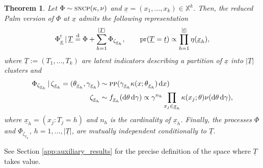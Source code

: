 \documentclass[11pt,a4paper,oneside]{article}
\newcommand{\deq}{\stackrel{\mbox{\scriptsize d}}{=}}
\newcommand{\dd}{\mathrm d}
\newcommand{\X}{\mathbb{X}}
\newcommand{\prob}{{\rm pr}}
\renewcommand{\mid}{\ensuremath{\,|\,}}
\newtheorem{theorem}{Theorem}
\theoremstyle{definition}
\theoremstyle{remark}
\begin{document}
\begin{theorem}\label{thm:red_palm_sncp} 
Let $\Phi \sim \textsc{sncp}(\kappa, \nu)$ and $\underline{x} = (x_1, \ldots, x_k) \in \X^k$. Then, the reduced Palm version of $\Phi$ at $\underline{x}$ admits the following representation
\begin{equation}\label{eq:thesis_palm_sncp}
    \Phi^!_{\underline{x}}\mid \underline{T} \deq \Phi + \sum_{h = 1}^{|\underline{T}|} \Phi_{\zeta_{{\underline{x}}_h}},\qquad \prob(\underline{T} = \underline{t}) \propto \prod_{h=1}^{|\underline{t}|} \eta(\underline{x}_h),
\end{equation}
where $\underline{T} := (T_1,\ldots,T_k)$ are latent indicators describing a partition of $\underline{x}$ into $|\underline{T}|$ clusters and
\begin{equation*}
    \begin{aligned}
        \Phi_{\zeta_{{\underline{x}}_h}} \mid \zeta_{{\underline{x}}_h} = (\theta_{{\underline{x}}_h}, \gamma_{{\underline{x}}_h}) &\sim \textsc{pp}(\gamma_{{\underline{x}}_h} \kappa(x; \theta_{{\underline{x}}_h}) \,\dd x)\\
        \zeta_{{\underline{x}}_h}  &\sim f_{{\underline{x}}_h}(\dd \theta\, \dd \gamma) \propto \gamma^{n_h} \prod_{x_j \in 
        \underline{x}_h}\kappa(x_j;\theta) \nu(\dd \theta\, \dd \gamma),
    \end{aligned}
\end{equation*}
where $\underline{x}_h = (x_j: T_j = h)$ and $n_h$ is the cardinality of $\underline{x}_h$.
Finally, the processes $\Phi$ and $\Phi_{\zeta_{{\underline{x}}_h}}$, $h = 1,\ldots, |\underline{T}|$, are mutually independent conditionally to $\underline{T}$.
\end{theorem}
See Section \ref{app:auxiliary_results} for the precise definition of the space where $\underline{T}$ takes value. \\
\end{document}
